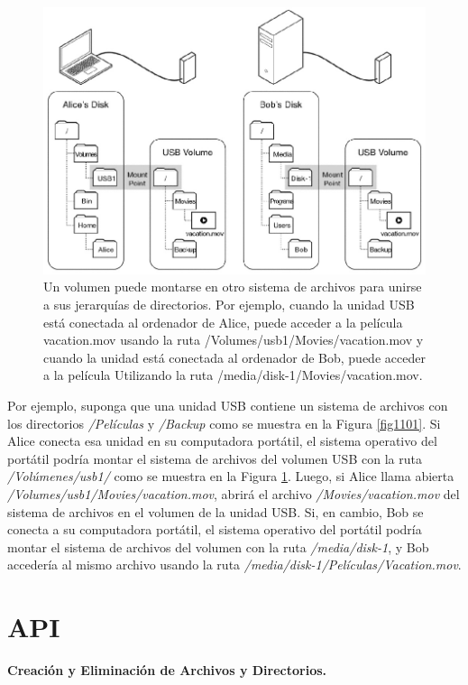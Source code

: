 \documentclass[10pt]{book}
\begin{document}
\begin{figure}[tbhp]
\centerline{\includegraphics[scale=0.70]{img/fig1102}}
\caption{Un volumen puede montarse en otro sistema de archivos para unirse a sus jerarquías de directorios. Por ejemplo, cuando la unidad USB está conectada al ordenador de Alice, puede acceder a la película vacation.mov usando la ruta /Volumes/usb1/Movies/vacation.mov y cuando la unidad está conectada al ordenador de Bob, puede acceder a la película Utilizando la ruta /media/disk-1/Movies/vacation.mov.}
\label{fig1102}
\end{figure}

Por ejemplo, suponga que una unidad USB contiene un sistema de archivos con los directorios \textit{/Películas} y \textit{/Backup} como se muestra en la Figura \ref{fig1101}. Si Alice conecta esa unidad en su computadora portátil, el sistema operativo del portátil podría montar el sistema de archivos del volumen USB con la ruta \textit{/Volúmenes/usb1/} como se muestra en la Figura \ref{fig1102}. Luego, si Alice llama abierta \textit{/Volumes/usb1/Movies/vacation.mov}, abrirá el archivo \textit{/Movies/vacation.mov} del sistema de archivos en el volumen de la unidad USB. Si, en cambio, Bob se conecta a su computadora portátil, el sistema operativo del portátil podría montar el sistema de archivos del volumen con la ruta \textit{/media/disk-1}, y Bob accedería al mismo archivo usando la ruta \textit{/media/disk-1/Películas/Vacation.mov}.


\section{API}
\textbf{Creación y Eliminación de Archivos y Directorios.}
\end{document}
